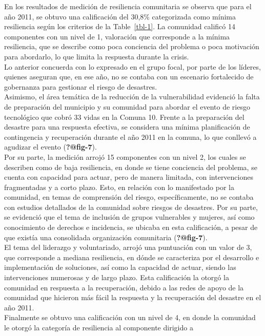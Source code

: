 \documentclass[
  letterpaper,
]{book}
\begin{document}
En los resultados de medición de resiliencia comunitaria se observa que
para el año 2011, se obtuvo una calificación del 30,8\% categorizada
como mínima resiliencia según los criterios de la Table~\ref{tbl-1}. La
comunidad calificó 14 componentes con un nivel de 1, valoración que
corresponde a la mínima resiliencia, que se describe como poca
conciencia del problema o poca motivación para abordarlo, lo que limita
la respuesta durante la crisis.\\
Lo anterior concuerda con lo expresado en el grupo focal, por parte de
los líderes, quienes aseguran que, en ese año, no se contaba con un
escenario fortalecido de gobernanza para gestionar el riesgo de
desastres.\\
Asimismo, el área temática de la reducción de la vulnerabilidad
evidenció la falta de preparación del municipio y su comunidad para
abordar el evento de riesgo tecnológico que cobró 33 vidas en la Comuna
10. Frente a la preparación del desastre para una respuesta efectiva, se
considera una mínima planificación de contingencia y recuperación
durante el año 2011 en la comuna, lo que conllevó a agudizar el evento
(\textbf{?@fig-7}).\\
Por su parte, la medición arrojó 15 componentes con un nivel 2, los
cuales se describen como de baja resiliencia, en donde se tiene
conciencia del problema, se cuenta con capacidad para actuar, pero de
manera limitada, con intervenciones fragmentadas y a corto plazo. Esto,
en relación con lo manifestado por la comunidad, en temas de comprensión
del riesgo, específicamente, no se contaba con estudios detallados de la
comunidad sobre riesgos de desastres. Por su parte, se evidenció que el
tema de inclusión de grupos vulnerables y mujeres, así como conocimiento
de derechos e incidencia, se ubicaba en esta calificación, a pesar de
que existía una consolidada organización comunitaria
(\textbf{?@fig-7}).\\
El tema del liderazgo y voluntariado, arrojó una puntuación con un valor
de 3, que corresponde a mediana resiliencia, en dónde se caracteriza por
el desarrollo e implementación de soluciones, así como la capacidad de
actuar, siendo las intervenciones numerosas y de largo plazo. Esta
calificación la otorgó la comunidad en respuesta a la recuperación,
debido a las redes de apoyo de la comunidad que hicieron más fácil la
respuesta y la recuperación del desastre en el año 2011.\\
Finalmente se obtuvo una calificación con un nivel de 4, en donde la
comunidad le otorgó la categoría de resiliencia al componente dirigido a
\end{document}
